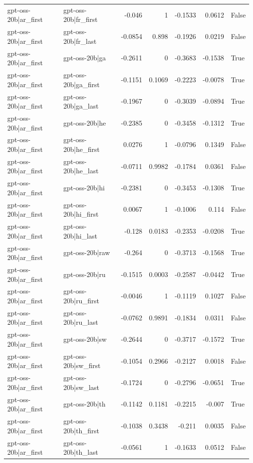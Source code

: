 \begin{table}
\begin{tabular}{l l r r r r l}
gpt-oss-20b|ar_first & gpt-oss-20b|fr_first & -0.046 & 1 & -0.1533 & 0.0612 & False \\
gpt-oss-20b|ar_first & gpt-oss-20b|fr_last & -0.0854 & 0.898 & -0.1926 & 0.0219 & False \\
gpt-oss-20b|ar_first & gpt-oss-20b|ga & -0.2611 & 0 & -0.3683 & -0.1538 & True \\
gpt-oss-20b|ar_first & gpt-oss-20b|ga_first & -0.1151 & 0.1069 & -0.2223 & -0.0078 & True \\
gpt-oss-20b|ar_first & gpt-oss-20b|ga_last & -0.1967 & 0 & -0.3039 & -0.0894 & True \\
gpt-oss-20b|ar_first & gpt-oss-20b|he & -0.2385 & 0 & -0.3458 & -0.1312 & True \\
gpt-oss-20b|ar_first & gpt-oss-20b|he_first & 0.0276 & 1 & -0.0796 & 0.1349 & False \\
gpt-oss-20b|ar_first & gpt-oss-20b|he_last & -0.0711 & 0.9982 & -0.1784 & 0.0361 & False \\
gpt-oss-20b|ar_first & gpt-oss-20b|hi & -0.2381 & 0 & -0.3453 & -0.1308 & True \\
gpt-oss-20b|ar_first & gpt-oss-20b|hi_first & 0.0067 & 1 & -0.1006 & 0.114 & False \\
gpt-oss-20b|ar_first & gpt-oss-20b|hi_last & -0.128 & 0.0183 & -0.2353 & -0.0208 & True \\
gpt-oss-20b|ar_first & gpt-oss-20b|raw & -0.264 & 0 & -0.3713 & -0.1568 & True \\
gpt-oss-20b|ar_first & gpt-oss-20b|ru & -0.1515 & 0.0003 & -0.2587 & -0.0442 & True \\
gpt-oss-20b|ar_first & gpt-oss-20b|ru_first & -0.0046 & 1 & -0.1119 & 0.1027 & False \\
gpt-oss-20b|ar_first & gpt-oss-20b|ru_last & -0.0762 & 0.9891 & -0.1834 & 0.0311 & False \\
gpt-oss-20b|ar_first & gpt-oss-20b|sw & -0.2644 & 0 & -0.3717 & -0.1572 & True \\
gpt-oss-20b|ar_first & gpt-oss-20b|sw_first & -0.1054 & 0.2966 & -0.2127 & 0.0018 & False \\
gpt-oss-20b|ar_first & gpt-oss-20b|sw_last & -0.1724 & 0 & -0.2796 & -0.0651 & True \\
gpt-oss-20b|ar_first & gpt-oss-20b|th & -0.1142 & 0.1181 & -0.2215 & -0.007 & True \\
gpt-oss-20b|ar_first & gpt-oss-20b|th_first & -0.1038 & 0.3438 & -0.211 & 0.0035 & False \\
gpt-oss-20b|ar_first & gpt-oss-20b|th_last & -0.0561 & 1 & -0.1633 & 0.0512 & False \\

\end{tabular}
\end{table}
